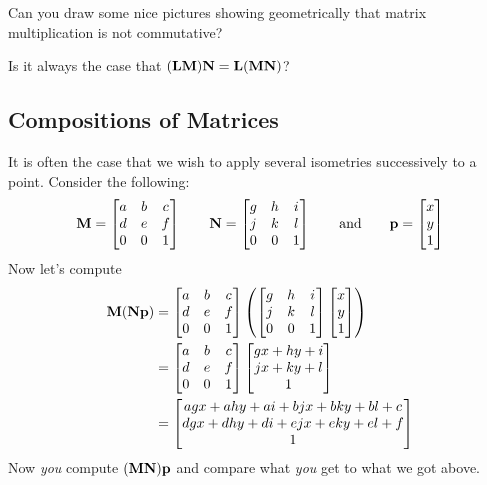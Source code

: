 \begin{question}
Can you draw some nice pictures showing geometrically that matrix
multiplication is not commutative?
\end{question}
\QM

\begin{question}
Is it always the case that $(\mathbf{L}\mathbf{M})\mathbf{N} = \mathbf{L}(\mathbf{M}\mathbf{N})$?
\end{question}
\QM




\subsection{Compositions of Matrices}

It is often the case that we wish to apply several isometries
successively to a point. Consider the following:
\[
\mathbf{M} =
\begin{bmatrix}
a & b & c\\
d & e & f \\
0 & 0 & 1
\end{bmatrix}
\qquad
\mathbf{N} =
\begin{bmatrix}
g & h & i\\
j & k & l\\
0 & 0 & 1
\end{bmatrix}
\qquad\text{and}\qquad \mathbf{p} =
\begin{bmatrix}
x \\
y \\
1
\end{bmatrix}
\]
Now let's compute 
\begin{align*}
\mathbf{M}(\mathbf{N}\mathbf{p}) &= \begin{bmatrix}
a & b & c\\
d & e & f \\
0 & 0 & 1
\end{bmatrix} 
\left(
\begin{bmatrix}
g & h & i\\
j & k & l\\
0 & 0 & 1
\end{bmatrix}
\begin{bmatrix}
x \\
y \\
1
\end{bmatrix}
\right)\\
&= 
\begin{bmatrix}
a & b & c\\
d & e & f \\
0 & 0 & 1
\end{bmatrix} 
\begin{bmatrix}
gx+hy + i\\
jx+ky +l\\
1
\end{bmatrix} \\
&=
\begin{bmatrix}
agx+ahy +ai + bjx+bky+bl+c\\
dgx+dhy+ di + ejx+eky+el+f\\
1
\end{bmatrix}
\end{align*}
Now \textit{you} compute $(\mathbf{M}\mathbf{N})\mathbf{p}$ and compare what
\textit{you} get to what we got above.



